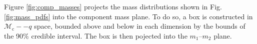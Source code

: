 Figure \ref{fig:comp_masses} projects the mass distributions shown in Fig. \ref{fig:mass_pdfs} into the component mass plane.  To do so, a box is constructed in $\mathcal{M}_\mathrm{c}--q$ space, bounded above and below in each dimension by the bounds of the 90\% credible interval.  The box is then pojected into the $m_1$--$m_2$ plane.